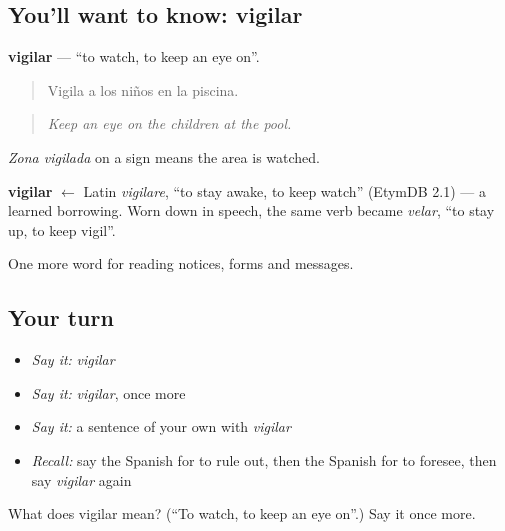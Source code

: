 \subsection*{You'll want to know: vigilar}
\textbf{vigilar} — \textquotedblleft{}to watch, to keep an eye on\textquotedblright{}.

\begin{quote}
Vigila a los niños en la piscina.
\end{quote}

\begin{quote}
\emph{Keep an eye on the children at the pool.}
\end{quote}

\emph{Zona vigilada} on a sign means the area is watched.

\begin{cousinweb}
\textbf{vigilar} $\leftarrow$ Latin \emph{vigilare}, \textquotedblleft{}to stay awake, to keep watch\textquotedblright{} (EtymDB 2.1) — a learned borrowing. Worn down in speech, the same verb became \emph{velar}, \textquotedblleft{}to stay up, to keep vigil\textquotedblright{}.
\end{cousinweb}

\begin{grammarlens}[title={What you've built}]
One more word for reading notices, forms and messages.
\end{grammarlens}

\subsection*{Your turn}
\begin{itemize}
\raggedright
  \item \emph{Say it:} \emph{vigilar}
  \item \emph{Say it:} \emph{vigilar}, once more
  \item \emph{Say it:} a sentence of your own with \emph{vigilar}
  \item \emph{Recall:} say the Spanish for to rule out, then the Spanish for to foresee, then say \emph{vigilar} again
\end{itemize}

\begin{tcolorbox}[breakable,colback=teal!4,colframe=teal!35!black,title={Before you move on}]
What does vigilar mean? (\textquotedblleft{}To watch, to keep an eye on\textquotedblright{}.) Say it once more.
\end{tcolorbox}
